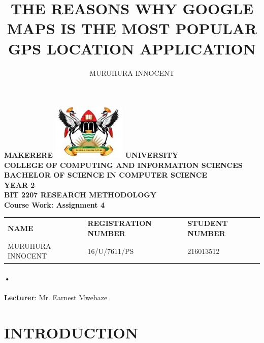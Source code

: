 \documentclass[7pt]{article}
\begin{document}
\begin{Huge}
\begin{center}
\begin{normalsize}
\textbf{MAKERERE \includegraphics[scale=0.5]{logo} UNIVERSITY }\\

\textbf{COLLEGE OF COMPUTING AND INFORMATION SCIENCES} \\

\textbf{BACHELOR OF SCIENCE IN COMPUTER SCIENCE} \\
\textbf{YEAR 2} \\
\textbf{BIT 2207 RESEARCH METHODOLOGY} \\
\textbf{Course Work: Assignment 4}\\
\end{normalsize}
\end{center}
\end{Huge}

\begin{center}
\begin{tabular}{l l l}
\textbf{NAME}  & \textbf{REGISTRATION NUMBER} & \textbf{STUDENT NUMBER} \\
MURUHURA INNOCENT & 16/U/7611/PS & 216013512 \\
\end{tabular}

\paragraph{•}
\textbf{Lecturer}: Mr. Earnest Mwebaze
\end{center}

\newpage

\title{THE REASONS WHY GOOGLE MAPS IS THE MOST POPULAR GPS LOCATION APPLICATION}
\author{MURUHURA INNOCENT}      
\renewcommand{\today}{}

\maketitle

\section*{INTRODUCTION}
\end{document}

